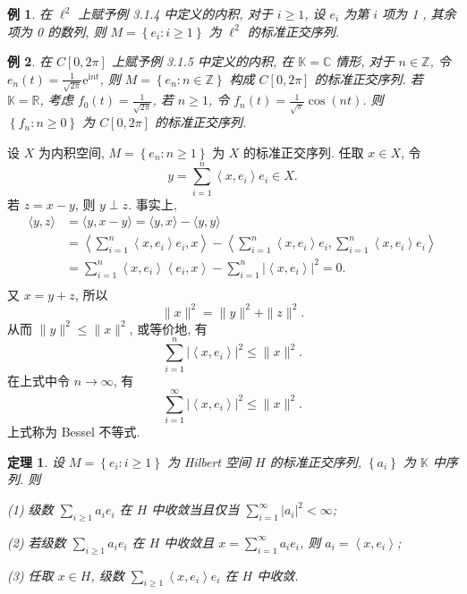 \documentclass[openany]{ctexbook}
\theoremstyle{kaiti}
\newtheorem{theorem}{定理}[section]
\theoremstyle{normal}
\newtheorem{example}{例}[section]
\begin{document}
\begin{example}
在 $\ell^2$ 上赋予例 3.1.4 中定义的内积, 对于 $i \geqslant 1$, 设 $e_{i}$ 为第 $i$ 项为 1 , 其余项为 0 的数列, 则 $M=\left\{e_{i}: i \geqslant 1\right\}$ 为 $\ell^2$ 的标准正交序列.
\end{example}

\begin{example}
在 $C[0,2 \pi]$ 上赋予例 3.1.5 中定义的内积, 在 $\mathbb{K}=\mathbb{C}$ 情形, 对于 $n \in \mathbb{Z}$, 令 $e_n(t)=\frac{1}{\sqrt{2 \pi}} \mathrm{e}^{\mathrm{i} n t}$, 则 $M=\left\{e_n: n \in \mathbb{Z}\right\}$ 构成 $C[0,2 \pi]$ 的标准正交序列. 若 $\mathbb{K}=\mathbb{R}$, 考虑 $f_0(t)=\frac{1}{\sqrt{2 \pi}}$, 若 $n \geqslant 1$, 令 $f_n(t)=\frac{1}{\sqrt{\pi}} \cos (n t)$. 则 $\left\{f_n: n \geqslant 0\right\}$ 为 $C[0,2 \pi]$ 的标准正交序列. 
\end{example}

设 $X$ 为内积空间, $M=\left\{e_n: n \geqslant 1\right\}$ 为 $X$ 的标准正交序列. 任取 $x \in X$, 令
$$
y=\sum_{i=1}^n\left\langle x, e_{i}\right\rangle e_{i} \in X.
$$
若 $z=x-y$, 则 $y \perp z$. 事实上,
$$
  \begin{aligned}
    \langle y, z\rangle 
    &=\langle y, x-y\rangle=\langle y, x\rangle-\langle y, y\rangle \\
    &=\left\langle\sum_{i=1}^n\left\langle x, e_{i}\right\rangle e_{i}, x\right\rangle-\left\langle\sum_{i=1}^n\left\langle x, e_{i}\right\rangle e_{i}, \sum_{i=1}^n\left\langle x, e_{i}\right\rangle e_{i}\right\rangle \\
    &=\sum_{i=1}^n\left\langle x, e_{i}\right\rangle\left\langle e_{i}, x\right\rangle-\sum_{i=1}^n\left|\left\langle x, e_{i}\right\rangle\right|^2=0. \\
  \end{aligned}
$$
又 $x=y+z$, 所以
$$
\|x\|^2=\|y\|^2+\|z\|^2.
$$
从而 $\|y\|^2 \leqslant\|x\|^2$, 或等价地, 有
$$
\sum_{i=1}^n\left|\left\langle x, e_{i}\right\rangle\right|^2 \leqslant\|x\|^2.
$$
在上式中令 $n \rightarrow \infty$, 有
\begin{equation}
  \sum_{i=1}^{\infty}\left|\left\langle x, e_{i}\right\rangle\right|^2 \leqslant\|x\|^2.
\end{equation}
上式称为 Bessel 不等式.

\begin{theorem}
设 $M=\left\{e_{i}: i \geqslant 1\right\}$ 为 Hilbert 空间 $H$ 的标准正交序列, $\left\{a_{i}\right\}$ 为 $\mathbb{K}$ 中序列. 则

(1) 级数 $\sum_{i \geqslant 1} a_{i} e_{i}$ 在 $H$ 中收敛当且仅当 $\sum_{i=1}^{\infty}\left|a_{i}\right|^2<\infty$;

(2) 若级数 $\sum_{i \geqslant 1} a_{i} e_{i}$ 在 $H$ 中收敛且 $x=\sum_{i=1}^{\infty} a_{i} e_{i}$, 则 $a_{i}=\left\langle x, e_{i}\right\rangle$;

(3) 任取 $x \in H$, 级数 $\sum_{i \geqslant 1}\left\langle x, e_{i}\right\rangle e_{i}$ 在 $H$ 中收敛.
\end{theorem}
\end{document}
